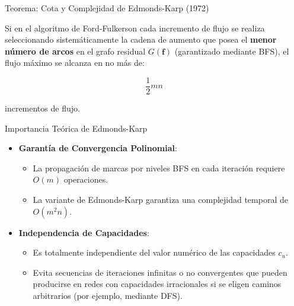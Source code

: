 \documentclass[
  ignorenonframetext,
]{beamer}
\providecommand{\tightlist}{%
  \setlength{\itemsep}{0pt}\setlength{\parskip}{0pt}}
\begin{document}
\begin{frame}{Teorema: Cota y Complejidad de Edmonds-Karp (1972)}
\label{teorema-cota-y-complejidad-de-edmonds-karp-1972}
\begin{tcolorbox}[enhanced jigsaw, opacityback=0, breakable, title=\textcolor{quarto-callout-important-color}{\faExclamation}\hspace{0.5em}{Cota y complejidad de Edmonds-Karp y Dinitz (1970 / 1972)}, colback=white, colbacktitle=quarto-callout-important-color!10!white, bottomrule=.15mm, opacitybacktitle=0.6, coltitle=black, bottomtitle=1mm, leftrule=.75mm, colframe=quarto-callout-important-color-frame, toptitle=1mm, titlerule=0mm, rightrule=.15mm, left=2mm, arc=.35mm, toprule=.15mm]

Si en el algoritmo de Ford-Fulkerson cada incremento de flujo se realiza
seleccionando sistemáticamente la cadena de aumento que posea el
\textbf{menor número de arcos} en el grafo residual \(G(\mathbf{f})\)
(garantizado mediante BFS), el flujo máximo se alcanza en no más de:

\[
\frac{1}{2} m n
\]

incrementos de flujo.

\end{tcolorbox}
\end{frame}

\begin{frame}{Importancia Teórica de Edmonds-Karp}
\label{importancia-teuxf3rica-de-edmonds-karp}
\begin{itemize}
\tightlist
\item
  \textbf{Garantía de Convergencia Polinomial}:

  \begin{itemize}
  \tightlist
  \item
    La propagación de marcas por niveles BFS en cada iteración requiere
    \(O(m)\) operaciones.
  \item
    La variante de Edmonds-Karp garantiza una complejidad temporal de
    \(O(m^2 n)\).
  \end{itemize}
\item
  \textbf{Independencia de Capacidades}:

  \begin{itemize}
  \tightlist
  \item
    Es totalmente independiente del valor numérico de las capacidades
    \(c_u\).
  \item
    Evita secuencias de iteraciones infinitas o no convergentes que
    pueden producirse en redes con capacidades irracionales si se eligen
    caminos arbitrarios (por ejemplo, mediante DFS).
  \end{itemize}
\end{itemize}
\end{frame}
\end{document}
